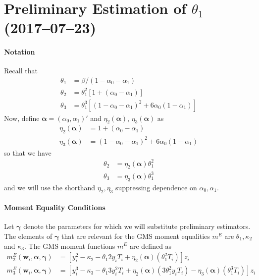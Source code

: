 \documentclass[12pt]{article}
\begin{document}
\section{Preliminary Estimation of $\theta_1$ (2017--07--23)}

\paragraph{Notation}
Recall that
\begin{align*}
  \theta_1 &= \beta/(1 - \alpha_0 - \alpha_1)\\
  \theta_2 &= \theta_1^2 \left[ 1 + (\alpha_0 - \alpha_1) \right]\\
  \theta_3 &= \theta_1^3\left[ \left( 1 - \alpha_0 - \alpha_1 \right)^2 + 6\alpha_0\left( 1 - \alpha_1 \right) \right]
\end{align*}
Now, define $\boldsymbol{\alpha} = (\alpha_0, \alpha_1)'$ and $\eta_2(\boldsymbol{\alpha})$, $\eta_3(\boldsymbol{\alpha})$ as
\begin{align*}
  \eta_2(\boldsymbol{\alpha}) &= 1 + (\alpha_0 - \alpha_1)\\
  \eta_3(\boldsymbol{\alpha}) &= (1 - \alpha_0 - \alpha_1)^2 + 6\alpha_0(1 - \alpha_1)
\end{align*}
so that we have
\begin{align*}
  \theta_2 &= \eta_2(\boldsymbol{\alpha}) \theta_1^2\\
  \theta_3 &= \eta_3(\boldsymbol{\alpha})\theta_1^3
\end{align*}
and we will use the shorthand $\eta_2, \eta_3$ suppressing dependence on $\alpha_0, \alpha_1$.



\paragraph{Moment Equality Conditions}
Let $\boldsymbol{\gamma}$ denote the parameters for which we will substitute preliminary estimators.
The elements of $\boldsymbol{\gamma}$ that are relevant for the GMS moment equalities $m^E$ are $\theta_1, \kappa_2$ and $\kappa_3$.
The GMS moment functions $m^E$ are defined as 
\begin{align*}
  m_2^E(\mathbf{w}_i, \boldsymbol{\alpha}, \boldsymbol{\gamma}) &= \left[y_i^2 - \kappa_2 - \theta_1 2y_i T_i + \eta_2(\boldsymbol{\alpha}) (\theta_1^2 T_i)\right] z_i \\
  m_3^E(\mathbf{w}_i, \boldsymbol{\alpha}, \boldsymbol{\gamma}) &= \left[ y_i^3 - \kappa_3 - \theta_1 3 y_i^2 T_i +  \eta_2(\boldsymbol{\alpha})(3\theta_1^2y_iT_i) -  \eta_3(\boldsymbol{\alpha})(\theta_1^3 T_i)\right]z_i
\end{align*}
\end{document}
